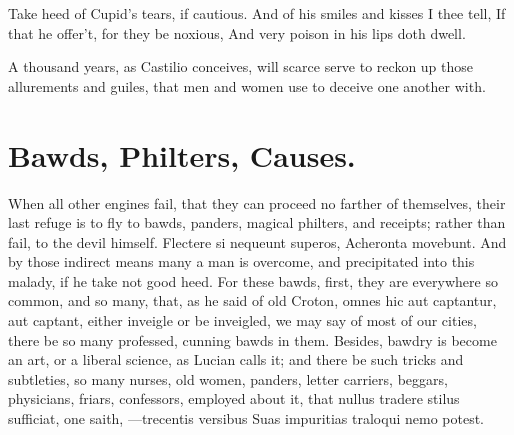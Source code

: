 {Take heed of Cupid's tears, if cautious.
And of his smiles and kisses I thee tell,
If that he offer't, for they be noxious,
And very poison in his lips doth dwell.

A thousand years, as Castilio conceives, will scarce serve to
reckon up those allurements and guiles, that men and women use to
deceive one another with.

\section{Bawds, Philters, Causes.}

When all other engines fail, that they can proceed no farther of
themselves, their last refuge is to fly to bawds, panders, magical
philters, and receipts; rather than fail, to the devil himself.
Flectere si nequeunt superos, Acheronta movebunt. And by those indirect
means many a man is overcome, and precipitated into this malady, if he
take not good heed. For these bawds, first, they are everywhere so
common, and so many, that, as he said of old Croton, omnes hic
aut captantur, aut captant, either inveigle or be inveigled, we may say
of most of our cities, there be so many professed, cunning bawds in
them. Besides, bawdry is become an art, or a liberal science, as Lucian
calls it; and there be such tricks and subtleties, so many nurses, old
women, panders, letter carriers, beggars, physicians, friars,
confessors, employed about it, that nullus tradere stilus sufficiat,
one saith,
---trecentis versibus
Suas impuritias traloqui nemo potest.

}
